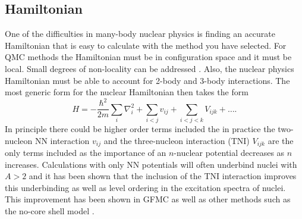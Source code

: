 \subsection{Hamiltonian}
One of the difficulties in many-body nuclear physics is finding an accurate Hamiltonian that is easy to calculate with the method you have selected. For QMC methods the Hamiltonian must be in configuration space and it must be local. Small degrees of non-locality can be addressed \cite{lynn2012,lynn2013}. Also, the nuclear physics Hamiltonian must be able to account for 2-body and 3-body interactions. The most generic form for the nuclear Hamiltonian then takes the form
\begin{equation}
   H = -\frac{\hbar^2}{2m}\sum\limits_i \nabla_i^2 + \sum\limits_{i<j} v_{ij} + \sum\limits_{i<j<k} V_{ijk} + \ldots.
\end{equation}
In principle there could be higher order terms included the in practice the two-nucleon NN interaction $v_{ij}$ and the three-nucleon interaction (TNI) $V_{ijk}$ are the only terms included as the importance of an $n$-nuclear potential decreases as $n$ increases. Calculations with only NN potentials will often underbind nuclei with $A>2$ and it has been shown that the inclusion of the TNI interaction improves this underbinding as well as level ordering in the excitation spectra of nuclei. This improvement has been shown in GFMC \cite{fantoni2008} as well as other methods such as the no-core shell model \cite{navratil2003}.


